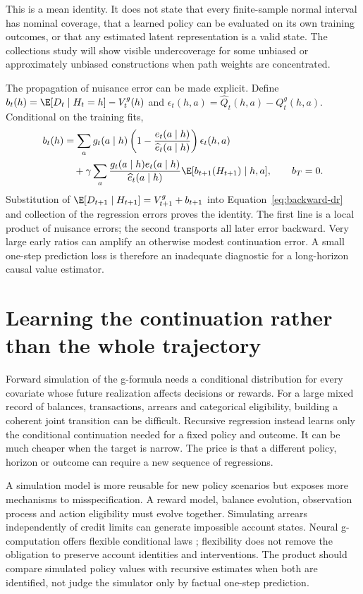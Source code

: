 This is a mean identity. It does not state that every finite-sample normal
interval has nominal coverage, that a learned policy can be evaluated on
its own training outcomes, or that any estimated latent representation is
a valid state. The collections study will show visible undercoverage for
some unbiased or approximately unbiased constructions when path weights
are concentrated.

The propagation of nuisance error can be made explicit. Define
$b_t(h)=\E[D_t\mid H_t=h]-V_t^g(h)$ and
$\epsilon_t(h,a)=\widehat Q_t(h,a)-Q_t^g(h,a)$. Conditional on the
training fits,
\begin{align}
 b_t(h)&=\sum_a g_t(a\mid h)
       \left(1-\frac{e_t(a\mid h)}{\widehat e_t(a\mid h)}\right)
       \epsilon_t(h,a)\nonumber\\
 &\quad+\gamma\sum_a
   \frac{g_t(a\mid h)e_t(a\mid h)}{\widehat e_t(a\mid h)}
   \E[b_{t+1}(H_{t+1})\mid h,a],\qquad b_T=0.
 \label{eq:dynamic-remainder}
\end{align}
Substitution of $\E[D_{t+1}\mid H_{t+1}]=V_{t+1}^g+b_{t+1}$
into Equation~\eqref{eq:backward-dr} and collection of the regression
errors proves the identity. The first line is a local product of nuisance
errors; the second transports all later error backward. Very large early
ratios can amplify an otherwise modest continuation error. A small
one-step prediction loss is therefore an inadequate diagnostic for a
long-horizon causal value estimator.

\section{Learning the continuation rather than the whole trajectory}
Forward simulation of the g-formula needs a conditional distribution for
every covariate whose
future realization affects decisions or rewards. For a large mixed record
of balances, transactions, arrears and categorical eligibility, building a
coherent joint transition can be difficult. Recursive regression instead
learns only the conditional continuation needed for a fixed policy and
outcome. It can be much cheaper when the target is narrow. The price is
that a different policy, horizon or outcome can require a new sequence of
regressions.

A simulation model is more reusable for new policy scenarios but exposes
more mechanisms to misspecification. A reward model, balance evolution,
observation process and action eligibility must evolve together. Simulating
arrears independently of credit limits can generate impossible account
states. Neural g-computation offers flexible conditional laws
\citep{gnet2020}; flexibility does not remove the obligation to preserve
account identities and interventions. The product should compare simulated
policy values with recursive estimates when both are identified, not
judge the simulator only by factual one-step prediction.

